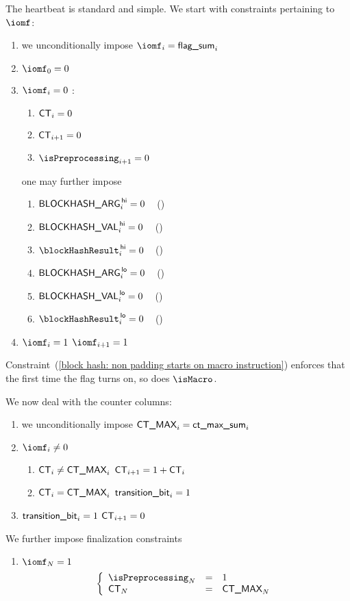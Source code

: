 The heartbeat is standard and simple. We start with constraints pertaining to $\iomf$:
\begin{enumerate}
	\item we unconditionally impose $\iomf _{i} = \locFlagSum _{i}$
	\item $\iomf_{0} = 0$
	\item \If $\iomf_{i} = 0$ \Then:
		\begin{enumerate}
			\item $\textsf{CT} _{i    } = 0$
			\item $\textsf{CT} _{i + 1} = 0$
			\item \label{block hash: non padding starts on macro instruction} $\isPreprocessing _{i + 1} = 0$
		\end{enumerate}
		one may further impose
		\begin{multicols}{2}
			\begin{enumerate}
				\item $\textsf{BLOCKHASH\_ARG} ^{\mathsf{\,hi}} _{i} = 0$ ~ (\trash)
				\item $\textsf{BLOCKHASH\_VAL}    ^{\mathsf{\,hi}} _{i} = 0$ ~ (\trash)
				\item $\blockHashResult   \high _{i} = 0$ ~ (\trash)
				\item $\textsf{BLOCKHASH\_ARG} ^{\mathsf{\,lo}}  _{i} = 0$ ~ (\trash)
				\item $\textsf{BLOCKHASH\_VAL}    ^{\mathsf{\,lo}}  _{i} = 0$ ~ (\trash)
				\item $\blockHashResult   \low  _{i} = 0$ ~ (\trash)
			\end{enumerate}
		\end{multicols}
	\item \If $\iomf_{i} = 1$ \Then $\iomf _{i + 1} = 1$
\end{enumerate}
\saNote{}
Constraint~(\ref{block hash: non padding starts on macro instruction}) enforces that the first time
the \iomf{} flag turns on, so does $\isMacro$.

\noindent We now deal with the counter columns:
\begin{enumerate}[resume]
	\item we unconditionally impose $\textsf{CT\_MAX} _{i} = \textsf{ct\_max\_sum} _{i}$
	\item \If $\iomf _{i} \neq 0$ \Then
		\begin{enumerate}
			\item \If $\textsf{CT} _{i} \neq \textsf{CT\_MAX} _{i}$ \Then $\textsf{CT} _{i + 1} = 1 + \textsf{CT} _{i}$
			\item \If $\textsf{CT} _{i} =    \textsf{CT\_MAX} _{i}$ \Then $\textsf{transition\_bit} _{i} = 1$
		\end{enumerate}
	\item \If $\textsf{transition\_bit} _{i} = 1$ \Then $\textsf{CT} _{i + 1} = 0$
\end{enumerate}
We further impose finalization constraints
\begin{enumerate}[resume]
	\item \If $\iomf _{N} = 1$ \Then
		\[
			\left\{ \begin{array}{lcl}
				\isPreprocessing _{N} & = & 1           \\
				\ct              _{N} & = & \maxCt _{N} \\
			\end{array} \right.
		\]
\end{enumerate}
